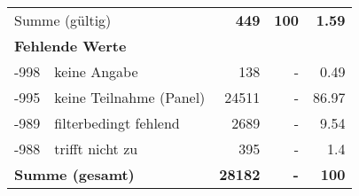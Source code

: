 \begin{longtable}{lXrrr}
     \midrule
     \multicolumn{2}{l}{Summe (gültig)} &
       \textbf{\num{449}} &
     \textbf{100} &
       \textbf{\num[round-mode=places,round-precision=2]{1,59}} \\
     \multicolumn{5}{l}{\textbf{Fehlende Werte}}\\
       -998 &
       keine Angabe &
         \num{138} &
        - &
         \num[round-mode=places,round-precision=2]{0,49} \\
       -995 &
       keine Teilnahme (Panel) &
         \num{24511} &
        - &
         \num[round-mode=places,round-precision=2]{86,97} \\
       -989 &
       filterbedingt fehlend &
         \num{2689} &
        - &
         \num[round-mode=places,round-precision=2]{9,54} \\
       -988 &
       trifft nicht zu &
         \num{395} &
        - &
         \num[round-mode=places,round-precision=2]{1,4} \\
     \midrule
     \multicolumn{2}{l}{\textbf{Summe (gesamt)}} &
          \textbf{\num{28182}} &
        \textbf{-} &
        \textbf{100} \\
     \bottomrule
     \end{longtable}
     
